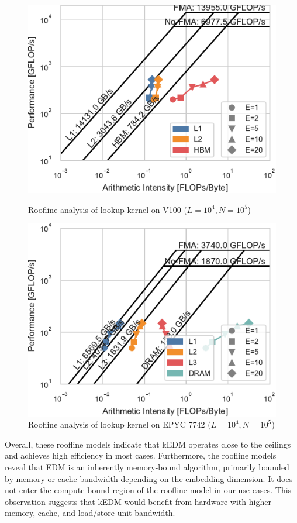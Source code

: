 \documentclass{acmart}
\begin{document}
\begin{figure}
    \centering
    \begin{minipage}{.5\textwidth}
    \includegraphics[width=.9\linewidth]{figs/roofline_lookup_wo_rho_v100}
    \caption{Roofline analysis of lookup kernel on V100 ($L=10^4, N=10^5$)}%
    \label{fig:roofline-lookup-v100}
    \end{minipage}%
    \begin{minipage}{.5\textwidth}
    \includegraphics[width=.9\linewidth]{figs/roofline_lookup_wo_rho_epyc}
    \caption{Roofline analysis of lookup kernel on EPYC 7742 ($L=10^4, N=10^5$)}%
    \label{fig:roofline-lookup-eypc}
    \end{minipage}%
\end{figure}

Overall, these roofline models indicate that kEDM operates close to the
ceilings and achieves high efficiency in most cases. Furthermore, the roofline
models reveal that EDM is an inherently memory-bound algorithm, primarily
bounded by memory or cache bandwidth depending on the embedding dimension. It
does not enter the compute-bound region of the roofline model in our use cases.
This observation suggests that kEDM would benefit from hardware with higher memory, 
cache, and load/store unit bandwidth.
\end{document}
